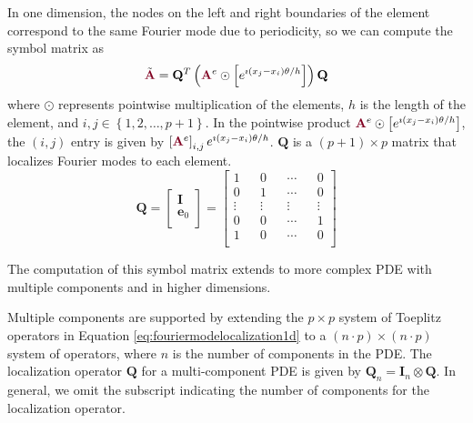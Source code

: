 In one dimension, the nodes on the left and right boundaries of the element correspond to the same Fourier mode due to periodicity, so we can compute the symbol matrix as
\begin{equation}
\tilde{{\color{burgundy}\mathbf{A}}} = \mathbf{Q}^T \left( {\color{burgundy}\mathbf{A}}^e \odot \left[ e^{\imath \left( x_j - x_i \right) \theta / h} \right] \right) \mathbf{Q}
\end{equation}
where $\odot$ represents pointwise multiplication of the elements, $h$ is the length of the element, and $i, j \in \left\lbrace 1, 2, \dots, p + 1 \right\rbrace$.
In the pointwise product ${\color{burgundy}\mathbf{A}}^e \odot \left[ e^{\imath \left( x_j - x_i \right) \theta / h} \right]$, the $\left( i, j \right)$ entry is given by $\left[ {\color{burgundy}\mathbf{A}}^e \right]_{i, j} e^{\imath \left( x_j - x_i \right) \theta / h}$.
$\mathbf{Q}$ is a $\left( p + 1 \right) \times p$ matrix that localizes Fourier modes to each element.
\begin{equation}
\mathbf{Q} =
\begin{bmatrix}
    \mathbf{I}   \\
    \mathbf{e}_0 \\
\end{bmatrix} =
\begin{bmatrix}
    1      && 0      && \cdots && 0      \\
    0      && 1      && \cdots && 0      \\
    \vdots && \vdots && \vdots && \vdots \\
    0      && 0      && \cdots && 1      \\
    1      && 0      && \cdots && 0      \\
\end{bmatrix}
\label{eq:fouriermodelocalization1d}
\end{equation}

The computation of this symbol matrix extends to more complex PDE with multiple components and in higher dimensions.

Multiple components are supported by extending the $p \times p$ system of Toeplitz operators in Equation \ref{eq:fouriermodelocalization1d} to a $\left( n \cdot p \right) \times \left( n \cdot p \right)$ system of operators, where $n$ is the number of components in the PDE.
The localization operator $\mathbf{Q}$ for a multi-component PDE is given by $\mathbf{Q}_n = \mathbf{I}_n \otimes \mathbf{Q}$.
In general, we omit the subscript indicating the number of components for the localization operator.

